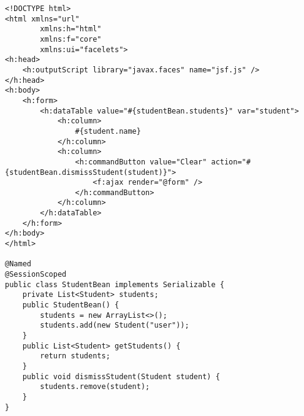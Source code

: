 \documentclass{article}
\begin{document}
\begin{lstlisting}[frame=single, basicstyle=\ttfamily, breaklines=true, breakatwhitespace=true, postbreak=\mbox{\textcolor{red}{$\hookrightarrow$}\space}]
<!DOCTYPE html>
<html xmlns="url"
        xmlns:h="html"
        xmlns:f="core"
        xmlns:ui="facelets">
<h:head>
    <h:outputScript library="javax.faces" name="jsf.js" />
</h:head>
<h:body> 
    <h:form>
        <h:dataTable value="#{studentBean.students}" var="student">
            <h:column>
                #{student.name}
            </h:column>
            <h:column>
                <h:commandButton value="Clear" action="#{studentBean.dismissStudent(student)}">
                    <f:ajax render="@form" />
                </h:commandButton>
            </h:column>
        </h:dataTable>
    </h:form>
</h:body>
</html>

@Named
@SessionScoped
public class StudentBean implements Serializable {
    private List<Student> students;
    public StudentBean() {
        students = new ArrayList<>();
        students.add(new Student("user"));
    }
    public List<Student> getStudents() {
        return students;
    }
    public void dismissStudent(Student student) {
        students.remove(student);
    }
}
    
\end{lstlisting}
\end{document}
